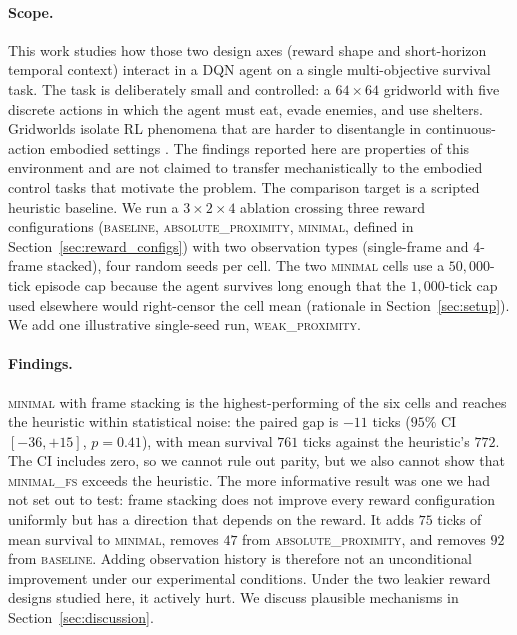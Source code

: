 \documentclass[12pt,a4paper,titlepage]{article}
\begin{document}
\paragraph{Scope.} This work studies how those two design axes (reward shape and short-horizon temporal context) interact in a DQN agent on a single multi-objective survival task. The task is deliberately small and controlled: a $64 \times 64$ gridworld with five discrete actions in which the agent must eat, evade enemies, and use shelters. Gridworlds isolate RL phenomena that are harder to disentangle in continuous-action embodied settings \citep{Leike2017, ChevalierBoisvert2023}. The findings reported here are properties of this environment and are not claimed to transfer mechanistically to the embodied control tasks that motivate the problem. The comparison target is a scripted heuristic baseline. We run a $3 \times 2 \times 4$ ablation crossing three reward configurations (\textsc{baseline}, \textsc{absolute\_proximity}, \textsc{minimal}, defined in Section~\ref{sec:reward_configs}) with two observation types (single-frame and 4-frame stacked), four random seeds per cell. The two \textsc{minimal} cells use a $50{,}000$-tick episode cap because the agent survives long enough that the $1{,}000$-tick cap used elsewhere would right-censor the cell mean (rationale in Section~\ref{sec:setup}). We add one illustrative single-seed run, \textsc{weak\_proximity}.

\paragraph{Findings.} \textsc{minimal} with frame stacking is the highest-performing of the six cells and reaches the heuristic within statistical noise: the paired gap is $-11$ ticks ($95\%$ CI $[-36, +15]$, $p = 0.41$), with mean survival $761$ ticks against the heuristic's $772$. The CI includes zero, so we cannot rule out parity, but we also cannot show that \textsc{minimal\_fs} exceeds the heuristic. The more informative result was one we had not set out to test: frame stacking does not improve every reward configuration uniformly but has a direction that depends on the reward. It adds $75$ ticks of mean survival to \textsc{minimal}, removes $47$ from \textsc{absolute\_proximity}, and removes $92$ from \textsc{baseline}. Adding observation history is therefore not an unconditional improvement under our experimental conditions. Under the two leakier reward designs studied here, it actively hurt. We discuss plausible mechanisms in Section~\ref{sec:discussion}.
\end{document}
